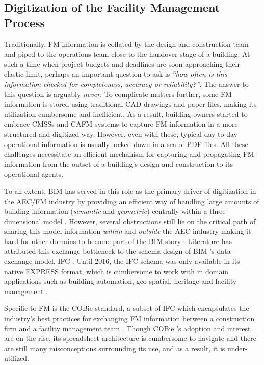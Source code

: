 \subsection{Digitization of the Facility Management Process}
\label{subsec:digitization of FM}
Traditionally, \ac{FM} information is collated by the design and construction team and piped to the operations team close to the handover stage of a building. At such a time when project budgets and deadlines are soon approaching their elastic limit, perhaps an important question to ask is \textit{“how often is this information checked for completeness, accuracy or reliability?”}. The answer to this question is arguably \textit{never}. To complicate matters further, some \ac{FM} information is stored using traditional \ac{CAD} drawings and paper files, making its utilization cumbersome and inefficient. As a result, building owners started to embrace \acp{CMSS} and \ac{CAFM} systems to capture \ac{FM} information in a more structured and digitized way. However, even with these, typical day-to-day operational information is usually locked down in a sea of \ac{PDF} files. All these challenges necessitate an efficient mechanism for capturing and propagating \ac{FM} information from the outset of a building’s design and construction to its operational agents.

To an extent, \ac{BIM} has served in this role as the primary driver of digitization in the \ac{AEC/FM} industry by providing an efficient way of handling large amounts of building information (\textit{semantic} and \textit{geometric}) centrally within a three-dimensional model \citep{Borrmann2010}. However, several obstructions still lie on the critical path of sharing this model information \textit{within} and \textit{outside} the AEC industry making it hard for other domains to become part of the BIM story \citep{Pauwels2017a, Pauwels2017SemanticOverview, Jeroen2018}. Literature has attributed this exchange bottleneck to the schema design of \ac{BIM} ’s data-exchange model, \ac{IFC} \citep{Barbau2012, Beetz2009, El-Mekawy2010, Gomez-Romero2015, Msc2016}. Until 2016, the \ac{IFC} schema was only available in its native EXPRESS format, which is cumbersome to work with in domain applications such as building automation, geo-spatial, heritage and facility management \citep{Pauwels2016, Pauwels2016a}. 

Specific to \ac{FM} is the \ac{COBie} standard, a subset of \ac{IFC} which encapsulates the industry’s best practices for exchanging \ac{FM} information between a construction firm and a facility management team \citep{WilliamEast2013FacilityView, Teicholz2018BIMManagers}.  Though \ac{COBie} ’s adoption and interest are on the rise, its spreadsheet architecture is cumbersome to navigate \citep{Anderson2012ConstructionOrganization, Kumar2021DevelopmentDatasheets, Kumar2021ExploringData} and there are still many misconceptions surrounding its use, and as a result, it is under-utilized.

